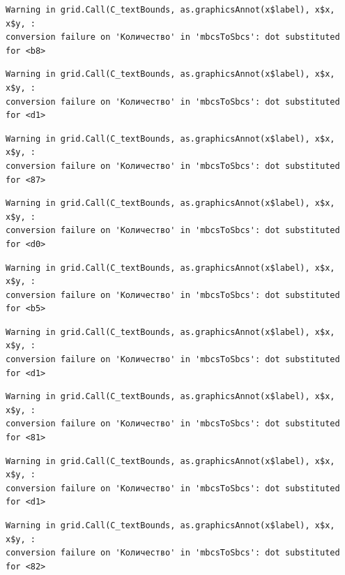 \documentclass[
  letterpaper,
  DIV=11,
  numbers=noendperiod]{scrreprt}
\theoremstyle{definition}
\theoremstyle{remark}
\begin{document}
\begin{verbatim}
Warning in grid.Call(C_textBounds, as.graphicsAnnot(x$label), x$x, x$y, :
conversion failure on 'Количество' in 'mbcsToSbcs': dot substituted for <b8>
\end{verbatim}

\begin{verbatim}
Warning in grid.Call(C_textBounds, as.graphicsAnnot(x$label), x$x, x$y, :
conversion failure on 'Количество' in 'mbcsToSbcs': dot substituted for <d1>
\end{verbatim}

\begin{verbatim}
Warning in grid.Call(C_textBounds, as.graphicsAnnot(x$label), x$x, x$y, :
conversion failure on 'Количество' in 'mbcsToSbcs': dot substituted for <87>
\end{verbatim}

\begin{verbatim}
Warning in grid.Call(C_textBounds, as.graphicsAnnot(x$label), x$x, x$y, :
conversion failure on 'Количество' in 'mbcsToSbcs': dot substituted for <d0>
\end{verbatim}

\begin{verbatim}
Warning in grid.Call(C_textBounds, as.graphicsAnnot(x$label), x$x, x$y, :
conversion failure on 'Количество' in 'mbcsToSbcs': dot substituted for <b5>
\end{verbatim}

\begin{verbatim}
Warning in grid.Call(C_textBounds, as.graphicsAnnot(x$label), x$x, x$y, :
conversion failure on 'Количество' in 'mbcsToSbcs': dot substituted for <d1>
\end{verbatim}

\begin{verbatim}
Warning in grid.Call(C_textBounds, as.graphicsAnnot(x$label), x$x, x$y, :
conversion failure on 'Количество' in 'mbcsToSbcs': dot substituted for <81>
\end{verbatim}

\begin{verbatim}
Warning in grid.Call(C_textBounds, as.graphicsAnnot(x$label), x$x, x$y, :
conversion failure on 'Количество' in 'mbcsToSbcs': dot substituted for <d1>
\end{verbatim}

\begin{verbatim}
Warning in grid.Call(C_textBounds, as.graphicsAnnot(x$label), x$x, x$y, :
conversion failure on 'Количество' in 'mbcsToSbcs': dot substituted for <82>
\end{verbatim}
\end{document}
